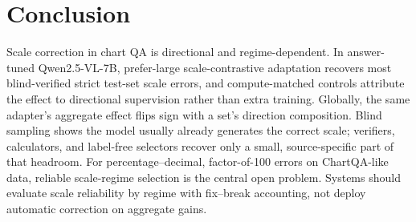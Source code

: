 \section{Conclusion}

Scale correction in chart QA is directional and regime-dependent. In answer-tuned Qwen2.5-VL-7B, prefer-large scale-contrastive adaptation recovers most blind-verified strict test-set scale errors, and compute-matched controls attribute the effect to directional supervision rather than extra training. Globally, the same adapter's aggregate effect flips sign with a set's direction composition. Blind sampling shows the model usually already generates the correct scale; verifiers, calculators, and label-free selectors recover only a small, source-specific part of that headroom. For percentage--decimal, factor-of-100 errors on ChartQA-like data, reliable scale-regime selection is the central open problem. Systems should evaluate scale reliability by regime with fix--break accounting, not deploy automatic correction on aggregate gains.
